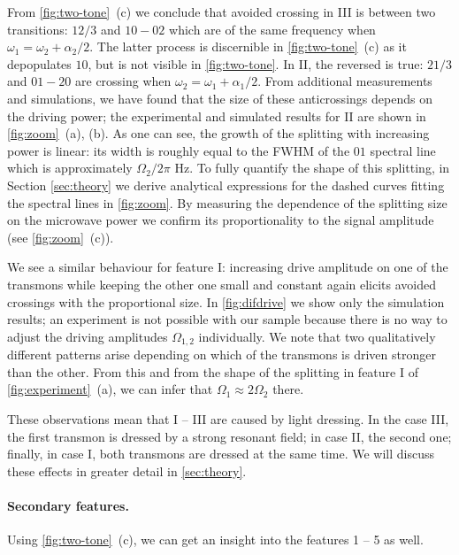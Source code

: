 \documentclass[%
 pra,
 amsmath,amssymb,
 reprint,%
]{revtex4-1}
\begin{document}
From \autoref{fig:two-tone}~(c) we conclude that avoided crossing in III is between two transitions: ${12/3}$ and ${10} - {02}$ which are of the same frequency when $\omega_1 = \omega_2+\alpha_2/2$. The latter process is discernible in \autoref{fig:two-tone}~(c) as it depopulates ${10}$, but is not visible in \autoref{fig:two-tone}. In II, the reversed is true: ${21/3}$ and ${01} - {20}$ are crossing when $\omega_2 = \omega_1+\alpha_1/2$. From additional measurements and simulations, we have found that the size of these anticrossings depends on the driving power; the experimental and simulated results for II are shown in \autoref{fig:zoom}~(a), (b). As one can see, the growth of the splitting with increasing power is linear: its width is roughly equal to the FWHM of the ${01}$ spectral line which is approximately $\Omega_2/2\pi$ Hz. To fully quantify the shape of this splitting, in Section \ref{sec:theory} we derive analytical expressions for the dashed curves fitting the spectral lines in \autoref{fig:zoom}. By measuring the dependence of the splitting size on the microwave power we confirm its proportionality to the signal amplitude (see \autoref{fig:zoom}~(c)).

We see a similar behaviour for feature I: increasing drive amplitude on one of the transmons while keeping the other one small and constant again elicits avoided crossings with the proportional size. In \autoref{fig:difdrive} we show only the simulation results; an experiment is not possible with our sample because there is no way to adjust the driving amplitudes $\Omega_{1,2}$ individually. We note that two qualitatively different patterns arise depending on which of the transmons is driven stronger than the other. From this and from the shape of the splitting in feature I of \autoref{fig:experiment}~(a), we can infer that $\Omega_1 \approx 2\Omega_2$ there.

These observations mean that I -- III are caused by light dressing. In the case III, the first transmon is dressed by a strong resonant field; in case II, the second one; finally, in case I, both transmons are dressed at the same time. We will discuss these effects in greater detail in \autoref{sec:theory}.

\paragraph{Secondary features.} Using \autoref{fig:two-tone}~(c), we can get an insight into the features 1 -- 5 as well. 
\end{document}
